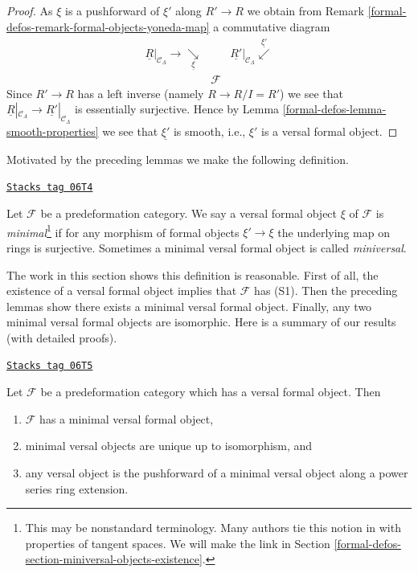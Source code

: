 \begin{proof}
\medskip\noindent
As $\xi$ is a pushforward of $\xi'$ along $R' \to R$ we obtain from
Remark \ref{formal-defos-remark-formal-objects-yoneda-map}
a commutative diagram
$$
\begin{array}{ccc}\underline{R}|_{\mathcal{C}_\Lambda} \longrightarrow\underset{\underline{\xi}}{\searrow} &  & \underline{R'}|_{\mathcal{C}_\Lambda} \overset{\underline{\xi'}}{\swarrow} \\  & \mathcal{F} & \end{array}
$$
Since $R' \to R$ has a left inverse (namely $R \to R/I = R'$) we see that
$\underline{R}|_{\mathcal{C}_\Lambda} \to
\underline{R'}|_{\mathcal{C}_\Lambda}$ is essentially surjective.
Hence by
Lemma \ref{formal-defos-lemma-smooth-properties}
we see that $\underline{\xi'}$ is smooth, i.e., $\xi'$ is a versal
formal object.
\end{proof}

Motivated by the preceding lemmas we make the following definition.

\begin{definition}
\label{formal-defos-definition-minimal-versal}
\href{https://stacks.math.columbia.edu/tag/06T4}{\texttt{Stacks tag 06T4}}

Let $\mathcal{F}$ be a predeformation category.
We say a versal formal object $\xi$ of $\mathcal{F}$ is
{\it minimal}\footnote{This may be nonstandard terminology. Many
authors tie this notion in with properties of tangent spaces.
We will make the link in
Section \ref{formal-defos-section-miniversal-objects-existence}.}
if for any morphism of formal objects
$\xi' \to \xi$ the underlying map on rings is surjective.
Sometimes a minimal versal formal object is called {\it miniversal}.
\end{definition}

The work in this section shows this definition is reasonable.
First of all, the existence of a versal formal object implies that
$\mathcal{F}$ has (S1). Then the preceding lemmas
show there exists a minimal versal formal object. Finally, any
two minimal versal formal objects are isomorphic. Here is a summary
of our results (with detailed proofs).

\begin{lemma}
\label{formal-defos-lemma-minimal-versal}
\href{https://stacks.math.columbia.edu/tag/06T5}{\texttt{Stacks tag 06T5}}

Let $\mathcal{F}$ be a predeformation category which
has a versal formal object. Then
\begin{enumerate}
\item $\mathcal{F}$ has a minimal versal formal object,
\item minimal versal objects are unique up to isomorphism, and
\item any versal object is the pushforward of a minimal versal
object along a power series ring extension.
\end{enumerate}
\end{lemma}

